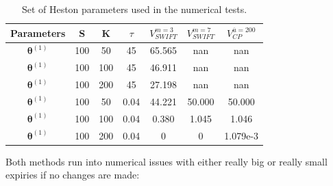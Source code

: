 \documentclass[12,twoside]{mammeTFM}
\theoremstyle{definition}
\theoremstyle{remark}
\begin{document}
\begin{table}[!h]
\begin{center}
 \begin{tabular}{|c | c | c | c | c | c | c |} 
 \hline
 Parameters & S & K & $\tau$ & $V_{SWIFT}^{m=3}$ & $V_{SWIFT}^{m=7}$ & $V_{CP}^{\overline{u} = 200}$ \\ [0.5ex] 
 \hline
 $\boldsymbol{\theta}^{(1)}$ & 100 & 50  & 45   & 65.565 & nan & nan \\ 
 \hline
 $\boldsymbol{\theta}^{(1)}$ & 100 & 100 & 45   & 46.911 & nan & nan \\ 
 \hline
 $\boldsymbol{\theta}^{(1)}$ & 100 & 200 & 45   & 27.198 & nan & nan \\ 
 \hline
 $\boldsymbol{\theta}^{(1)}$ & 100 & 50  & 0.04 & 44.221 & 50.000 & 50.000 \\ 
 \hline
 $\boldsymbol{\theta}^{(1)}$ & 100 & 100 & 0.04 & 0.380  & 1.045 & 1.046 \\ 
 \hline
 $\boldsymbol{\theta}^{(1)}$ & 100 & 200 & 0.04 & 0      & 0 & 1.079e-3 \\
 \hline
\end{tabular}
\end{center}
\caption{Set of Heston parameters used in the numerical tests.}\label{table:stress}
\end{table}

Both methods run into numerical issues with either really big or really small expiries if no changes are made:
\end{document}

